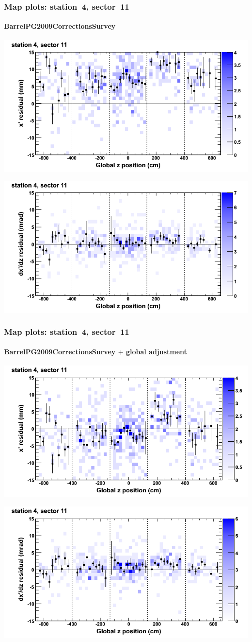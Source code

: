 \documentclass[compress]{beamer}
\begin{document}
\begin{frame}
\frametitle{Map plots: station~4, sector~11}
\framesubtitle{BarrelPG2009CorrectionsSurvey}
\includegraphics[width=0.5\linewidth]{mapplots_01/DTvsz_st4sec11_x.png}

\includegraphics[width=0.5\linewidth]{mapplots_01/DTvsz_st4sec11_dxdz.png}
\end{frame}
\begin{frame}
\frametitle{Map plots: station~4, sector~11}
\framesubtitle{BarrelPG2009CorrectionsSurvey $+$ global adjustment}
\includegraphics[width=0.5\linewidth]{mapplots_re01/DTvsz_st4sec11_x.png}

\includegraphics[width=0.5\linewidth]{mapplots_re01/DTvsz_st4sec11_dxdz.png}
\end{frame}
\end{document}
